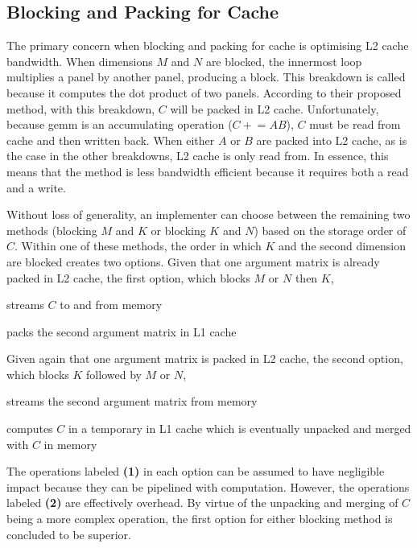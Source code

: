 \documentclass[\main/thesis.tex]{subfiles}
\begin{document}
\subsection{Blocking and Packing for Cache}
\label{sec:blockPack}
The primary concern when blocking and packing for cache is optimising L2 cache bandwidth.
When dimensions $M$ and $N$ are blocked, the innermost loop multiplies a panel by another panel, producing a block.
This breakdown is called  because it computes the dot product of two panels.
According to their proposed method, with this breakdown, $C$ will be packed in L2 cache.
Unfortunately, because \gls{gemm} is an accumulating operation (\eg $C \mathrel{+}= AB$), $C$ must be read from cache and then written back.
When either $A$ or $B$ are packed into L2 cache, as is the case in the other breakdowns, L2 cache is only read from.
In essence, this means that the  method is less bandwidth efficient because it requires both a read and a write.

Without loss of generality, an implementer can choose between the remaining two methods (blocking $M$ and $K$ or blocking $K$ and $N$) based on the storage order of $C$.
Within one of these methods, the order in which $K$ and the second dimension are blocked creates two options.
Given that one argument matrix is already packed in L2 cache, the first option, which blocks $M$ or $N$ then $K$,
\begin{enumerate*}[itemjoin*={{ and }}, label=\textbf{(\arabic*)}, after={.}]
  \item streams $C$ to and from memory
  \item packs the second argument matrix in L1 cache
\end{enumerate*}
Given again that one argument matrix is packed in L2 cache, the second option, which blocks $K$ followed by $M$ or $N$,
\begin{enumerate*}[itemjoin*={{ and }}, label=\textbf{(\arabic*)}, after={.}]
  \item streams the second argument matrix from memory
  \item computes $C$ in a temporary in L1 cache which is eventually unpacked and merged with $C$ in memory
\end{enumerate*}
The operations labeled \textbf{(1)} in each option can be assumed to have negligible impact because they can be pipelined with computation.
However, the operations labeled \textbf{(2)} are effectively overhead.
By virtue of the unpacking and merging of $C$ being a more complex operation, the first option for either blocking method is concluded to be superior.
\end{document}
